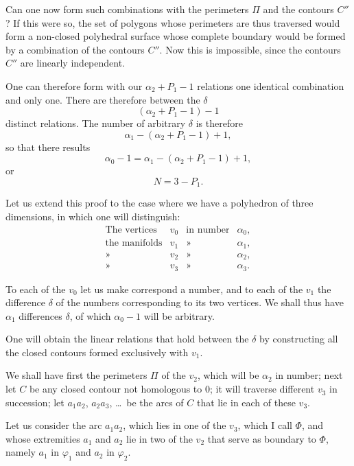 \documentclass{article}
\begin{document}
Can one now form such combinations with the perimeters $\Pi$ and the contours $C''$? If this were so, the set of polygons whose perimeters are thus traversed would form a non-closed polyhedral surface whose complete boundary would be formed by a combination of the contours $C''$. Now this is impossible, since the contours $C''$ are linearly independent.

One can therefore form with our $\alpha_{2} + P_{1} - 1$ relations one identical combination and only one. There are therefore between the $\delta$
\[ (\alpha_{2} + P_{1} - 1) - 1 \]
distinct relations. The number of arbitrary $\delta$ is therefore
\[ \alpha_{1} - (\alpha_{2} + P_{1} - 1) + 1, \]
so that there results
\[ \alpha_{0} - 1 = \alpha_{1} - (\alpha_{2} + P_{1} - 1) + 1, \]
or
\[ N = 3 - P_{1}. \]

Let us extend this proof to the case where we have a polyhedron of three dimensions, in which one will distinguish:
\[ \begin{matrix} \text{The vertices} & v_{0} & \text{in number} & \alpha_{0}, \\[1ex] \text{the manifolds} & v_{1} & \text{»} & \alpha_{1}, \\[1ex] \text{»} & v_{2} & \text{»} & \alpha_{2}, \\[1ex] \text{»} & v_{3} & \text{»} & \alpha_{3}. \end{matrix} \]

To each of the $v_{0}$ let us make correspond a number, and to each of the $v_{1}$ the difference $\delta$ of the numbers corresponding to its two vertices. We shall thus have $\alpha_{1}$ differences $\delta$, of which $\alpha_{0} - 1$ will be arbitrary.

One will obtain the linear relations that hold between the $\delta$ by constructing all the closed contours formed exclusively with $v_{1}$.

We shall have first the perimeters $\Pi$ of the $v_{2}$, which will be $\alpha_{2}$ in number; next let $C$ be any closed contour not homologous to 0; it will traverse different $v_{3}$ in succession; let $a_{1}a_{2}$, $a_{2}a_{3}$, \ldots\ be the arcs of $C$ that lie in each of these $v_{3}$.

Let us consider the arc $a_{1}a_{2}$, which lies in one of the $v_{3}$, which I call $\Phi$, and whose extremities $a_{1}$ and $a_{2}$ lie in two of the $v_{2}$ that serve as boundary to $\Phi$, namely $a_{1}$ in $\varphi_{1}$ and $a_{2}$ in $\varphi_{2}$.
\end{document}
